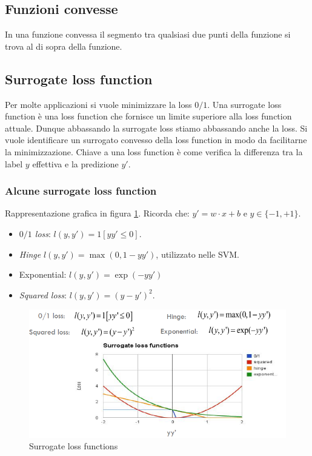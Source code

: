 	\subsection{Funzioni convesse}
	In una funzione convessa il segmento tra qualsiasi due punti della funzione si trova al di sopra della funzione.

	\subsection{Surrogate loss function}
	Per molte applicazioni si vuole minimizzare la loss $0/1$.
	Una surrogate loss function \`e una loss function che fornisce un limite superiore alla loss function attuale. 
	Dunque abbassando la surrogate loss stiamo abbassando anche la loss.
	Si vuole identificare un surrogato convesso della loss function in modo da facilitarne la minimizzazione.
	Chiave a una loss function \`e come verifica la differenza tra la label $y$ effettiva e la predizione $y'$.
	
		\subsubsection{Alcune surrogate loss function}
		
		Rappresentazione grafica in figura \ref{fig:chapter08-00}.
		Ricorda che: $y' = w \cdot x + b$ e $y \in \{-1,+1\}$.
		\begin{multicols}{2}
			\begin{itemize}
				\item \emph{$0/1$ loss}: $l(y, y')=1[yy'\le 0]$.
				\item \emph{Hinge} $l(y,y')=\max(0,1-yy')$, utilizzato nelle SVM.
				\item Exponential: $l(y,y')=\exp(-yy')$
				\item \emph{Squared loss}: $l(y,y')=(y-y')^2$.
			\end{itemize}
		\end{multicols}
		
		\begin{figure}
			\centering
			\includegraphics[width=0.6\linewidth]{imgs/chapter8/img0}
			\caption{Surrogate loss functions}
			\label{fig:chapter08-00}
		\end{figure}

